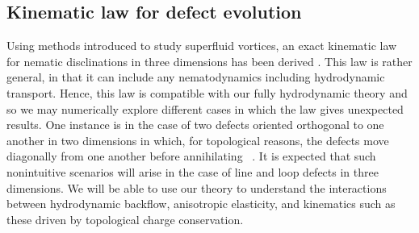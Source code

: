 \documentclass[reqno]{article}
\begin{document}
  \subsection{Kinematic law for defect evolution}
  Using methods introduced to study superfluid vortices, an exact kinematic law
  for nematic disclinations in three dimensions has been derived
  \cite{D1SM01584B}.
  This law is rather general, in that it can include any nematodynamics
  including hydrodynamic transport.
  Hence, this law is compatible with our fully hydrodynamic theory and so we may
  numerically explore different cases in which the law gives unexpected results.
  One instance is in the case of two defects oriented orthogonal to one another in
  two dimensions in which, for topological reasons, the defects move diagonally
  from one another before annihilating ~\cite{C7SM01195D}.
  It is expected that such nonintuitive scenarios will arise in the case of line
  and loop defects in three dimensions.
  We will be able to use our theory to understand the interactions between
  hydrodynamic backflow, anisotropic elasticity, and kinematics such as these
  driven by topological charge conservation.

  {}
  
	
\end{document}
